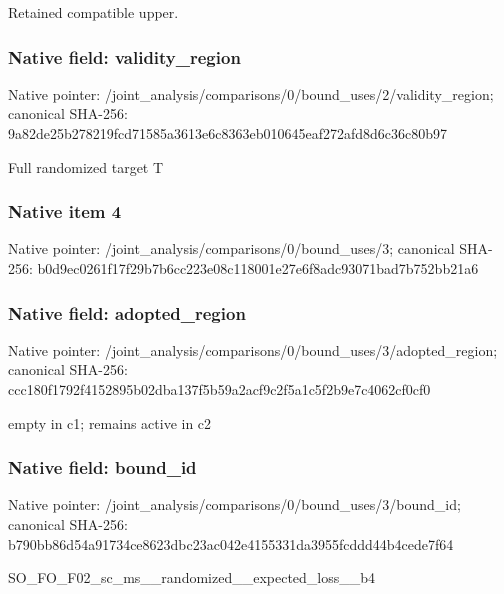 \documentclass[10pt,a4paper]{article}
\begin{document}
\begingroup\raggedright\sloppy Retained compatible upper.\par\endgroup

\subsubsection{Native field: validity\_\allowbreak{}region}
Native pointer: /joint\_\allowbreak{}analysis/comparisons/0/bound\_\allowbreak{}uses/2/validity\_\allowbreak{}region; canonical SHA-256: 9a82de25b278219fcd71585a3613e6c8363eb010645eaf272afd8d6c36c80b97

\begingroup\raggedright\sloppy Full randomized target T\par\endgroup

\subsubsection{Native item 4}
Native pointer: /joint\_\allowbreak{}analysis/comparisons/0/bound\_\allowbreak{}uses/3; canonical SHA-256: b0d9ec0261f17f29b7b6cc223e08c118001e27e6f8adc93071bad7b752bb21a6

\subsubsection{Native field: adopted\_\allowbreak{}region}
Native pointer: /joint\_\allowbreak{}analysis/comparisons/0/bound\_\allowbreak{}uses/3/adopted\_\allowbreak{}region; canonical SHA-256: ccc180f1792f4152895b02dba137f5b59a2acf9c2f5a1c5f2b9e7c4062cf0cf0

\begingroup\raggedright\sloppy empty in c1;\allowbreak{} remains active in c2\par\endgroup

\subsubsection{Native field: bound\_\allowbreak{}id}
Native pointer: /joint\_\allowbreak{}analysis/comparisons/0/bound\_\allowbreak{}uses/3/bound\_\allowbreak{}id; canonical SHA-256: b790bb86d54a91734ce8623dbc23ac042e4155331da3955fcddd44b4cede7f64

\begingroup\raggedright\sloppy SO\_\allowbreak{}FO\_\allowbreak{}F02\_\allowbreak{}sc\_\allowbreak{}ms\_\allowbreak{}\_\allowbreak{}randomized\_\allowbreak{}\_\allowbreak{}expected\_\allowbreak{}loss\_\allowbreak{}\_\allowbreak{}b4\par\endgroup
\end{document}
